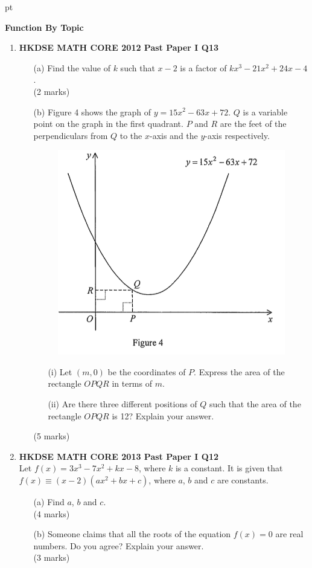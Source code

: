 \documentclass[12pt]{article}
\begin{document}
 pt
\begin{center}
	{\large \bf Function By Topic}
\end{center}
\vspace{0.05cm}

\begin{enumerate}
	\item \textbf{HKDSE MATH CORE 2012 Past Paper I Q13}
	\begin{enumerate}
		\item[(a)] Find the value of $k$ such that $x - 2$ is a factor of $kx^3 - 21x^2 + 24x - 4$. \\(2 marks)
		\item[(b)] Figure 4 shows the graph of $y = 15x^2 - 63x + 72$. $Q$ is a variable point on the graph in the first quadrant. $P$ and $R$ are the feet of the perpendiculars from $Q$ to the $x$-axis and the $y$-axis respectively.
		\begin{figure}[H]
			\centering
			\includegraphics[width = .3\linewidth]{2012Figure1.4}
		\end{figure}
		\begin{enumerate}
			\item[(i)] Let $(m, 0)$ be the coordinates of $P$. Express the area of the rectangle $OPQR$ in terms of $m$.
			\item[(ii)] Are there three different positions of $Q$ such that the area of the rectangle $OPQR$ is 12? Explain your answer.
		\end{enumerate}
		(5 marks)
	\end{enumerate}
	
	\item \textbf{HKDSE MATH CORE 2013 Past Paper I Q12}\\
	Let  $f(x) = 3x^3 - 7x^2 + kx - 8$, where $k$ is a constant. It is given that $f(x) \equiv (x - 2)(ax^2 + bx + c)$, where $a$, $b$ and $c$ are constants.
	\begin{enumerate}
		\item[(a)] Find $a$, $b$ and $c$. \\(4 marks)
		\item[(b)] Someone claims that all the roots of the equation  $f(x) = 0$ are real numbers. Do you agree? Explain your answer. \\(3 marks)
	\end{enumerate}


\end{enumerate}
\end{document}
